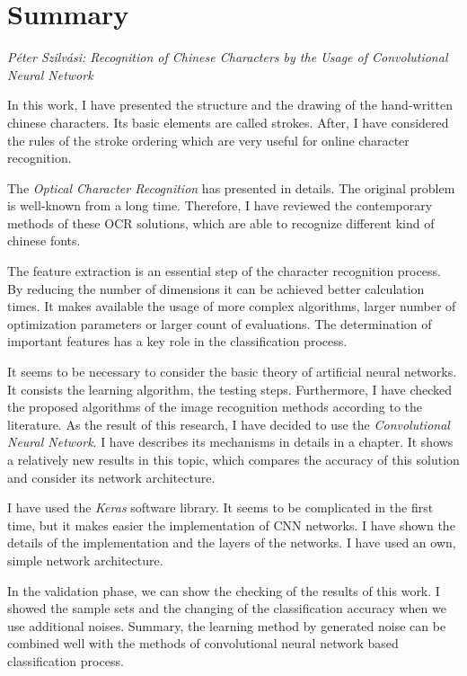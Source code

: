 \documentclass[a4paper,12pt]{article}
\begin{document}
\pagestyle{empty}

\section*{Summary}

\textit{Péter Szilvási: Recognition of Chinese Characters by the Usage of Convolutional Neural Network}

\bigskip

In this work, I have presented the structure and the drawing of the hand-written chinese characters. Its basic elements are called strokes. After, I have considered the rules of the stroke ordering which are very useful for online character recognition.

The \textit{Optical Character Recognition} has presented in details. The original problem is well-known from a long time. Therefore, I have reviewed the contemporary methods of these OCR solutions, which are able to recognize different kind of chinese fonts.

The feature extraction is an essential step of the character recognition process. By reducing the number of dimensions it can be achieved better calculation times. It makes available the usage of more complex algorithms, larger number of optimization parameters or larger count of evaluations. The determination of important features has a key role in the classification process.

It seems to be necessary to consider the basic theory of artificial neural networks. It consists the learning algorithm, the testing steps. Furthermore, I have checked the proposed algorithms of the image recognition methods according to the literature. As the result of this research, I have decided to use the \textit{Convolutional Neural Network}. I have describes its mechanisms in details in a chapter. It shows a relatively new results in this topic, which compares the accuracy of this solution and consider its network architecture.

I have used the \textit{Keras} software library. It seems to be complicated in the first time, but it makes easier the implementation of CNN networks. I have shown the details of the implementation and the layers of the networks. I have used an own, simple network architecture.

In the validation phase, we can show the checking of the results of this work. I showed the sample sets and the changing of the classification accuracy when we use additional noises. Summary, the learning method by generated noise can be combined well with the methods of convolutional neural network based classification process.
\end{document}

